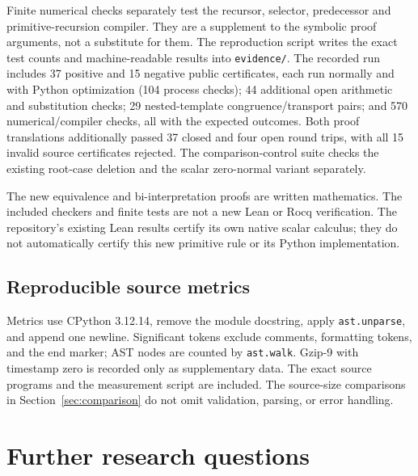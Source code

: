 \documentclass[11pt,letterpaper]{article}
\theoremstyle{definition}
\newcommand{\code}[1]{\texttt{#1}}
\begin{document}
Finite numerical checks separately test the recursor, selector,
predecessor and primitive-recursion compiler. They are a supplement
to the symbolic proof arguments, not a substitute for them. The
reproduction script writes the exact test counts and machine-readable
results into \code{evidence/}. The recorded run includes 37 positive
and 15 negative public certificates, each run normally and with
Python optimization (104 process checks); 44 additional open arithmetic
and substitution checks; 29 nested-template congruence/transport pairs;
and 570 numerical/compiler checks, all with the expected outcomes.
Both proof translations additionally passed 37 closed and four open
round trips, with all 15 invalid source certificates rejected. The
comparison-control suite checks the existing root-case deletion and
the scalar zero-normal variant separately.

The new equivalence and bi-interpretation proofs are written
mathematics. The included checkers and finite tests are not a new
Lean or Rocq verification. The repository's existing Lean results
certify its own native scalar calculus; they do not automatically
certify this new primitive rule or its Python implementation.

\subsection{Reproducible source metrics}

Metrics use CPython 3.12.14, remove the module docstring, apply
\code{ast.unparse}, and append one newline. Significant tokens
exclude comments, formatting tokens, and the end marker; AST nodes
are counted by \code{ast.walk}. Gzip-9 with timestamp zero is
recorded only as supplementary data. The exact source programs and
the measurement script are included. The source-size comparisons in
Section~\ref{sec:comparison} do not omit validation, parsing, or
error handling.

\section{Further research questions}
\end{document}
